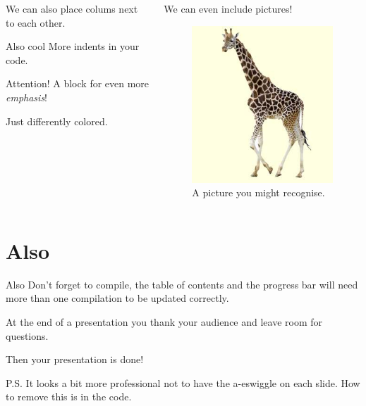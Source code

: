 \documentclass{beamer}
\theoremstyle{definition}
\theoremstyle{example}
\begin{document}
\begin{frame}
\begin{columns}[T]
	\begin{column}[T]{5cm}
		We can also place colums next to each other.
		
		\begin{block}{Also cool}
			More indents in your code.
		\end{block}
		\begin{alertblock}{Attention!}
			A block for even more \emph{emphasis}!
			
			Just differently colored.
		\end{alertblock}
	\end{column}
	\begin{column}[T]{5cm}
		We can even include pictures!
		\begin{figure}
			\includegraphics[scale=0.4]{Giraffe_klein.jpg}
			\caption{A picture you might recognise.}
		\end{figure}
		
	\end{column}
\end{columns}
\end{frame}


\section{Also}


\begin{frame}{Also}
Don't forget to compile, the table of contents and the progress bar will need more than one compilation to be updated correctly.

At the end of a presentation you thank your audience and leave room for questions.

Then your presentation is done!
\end{frame}


\begin{frame}{P.S.}
	It looks a bit more professional not to have the a-eswiggle on each slide.
	How to remove this is in the code. %
\end{frame}
\end{document}
